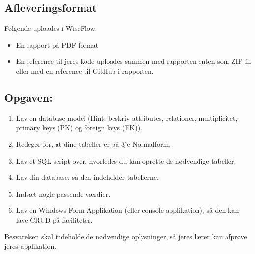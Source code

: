 \subsection{Afleveringsformat}
Følgende uploades i WiseFlow:
\begin{itemize}
    \item En rapport på PDF format
    \item En reference til jeres kode uploades sammen med rapporten enten som ZIP-fil eller med en reference til GitHub i rapporten.
\end{itemize}

\subsection{Opgaven:}
\begin{enumerate}
    \item Lav en database model (Hint: beskriv attributes, relationer, multiplicitet, primary keys (PK) og foreign keys (FK)).
    \item Redegør for, at dine tabeller er på 3je Normalform.
    \item Lav et SQL script over, hvorledes du kan oprette de nødvendige tabeller.
    \item Lav din database, så den indeholder tabellerne.
    \item Indsæt nogle passende værdier.
    \item Lav en Windows Form Applikation (eller console applikation), så den kan lave CRUD på faciliteter.
\end{enumerate}

Besvarelsen skal indeholde de nødvendige oplysninger, så jeres lærer kan afprøve jeres applikation.